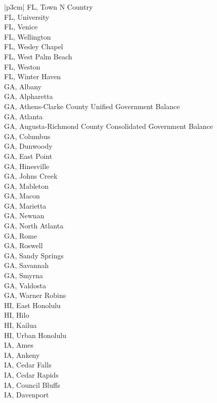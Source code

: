 \begin{customLongTable}{ |p{3cm}| }
FL, Town N Country \\ \hline
FL, University \\ \hline
FL, Venice \\ \hline
FL, Wellington \\ \hline
FL, Wesley Chapel \\ \hline
FL, West Palm Beach \\ \hline
FL, Weston \\ \hline
FL, Winter Haven \\ \hline
GA, Albany \\ \hline
GA, Alpharetta \\ \hline
GA, Athens-Clarke County Unified Government Balance \\ \hline
GA, Atlanta \\ \hline
GA, Augusta-Richmond County Consolidated Government Balance \\ \hline
GA, Columbus \\ \hline
GA, Dunwoody \\ \hline
GA, East Point \\ \hline
GA, Hinesville \\ \hline
GA, Johns Creek \\ \hline
GA, Mableton \\ \hline
GA, Macon \\ \hline
GA, Marietta \\ \hline
GA, Newnan \\ \hline
GA, North Atlanta \\ \hline
GA, Rome \\ \hline
GA, Roswell \\ \hline
GA, Sandy Springs \\ \hline
GA, Savannah \\ \hline
GA, Smyrna \\ \hline
GA, Valdosta \\ \hline
GA, Warner Robins \\ \hline
HI, East Honolulu \\ \hline
HI, Hilo \\ \hline
HI, Kailua \\ \hline
HI, Urban Honolulu \\ \hline
IA, Ames \\ \hline
IA, Ankeny \\ \hline
IA, Cedar Falls \\ \hline
IA, Cedar Rapids \\ \hline
IA, Council Bluffs \\ \hline
IA, Davenport \\ \hline

\end{customLongTable}
